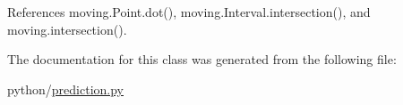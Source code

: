 References moving.\-Point.\-dot(), moving.\-Interval.\-intersection(), and moving.\-intersection().



The documentation for this class was generated from the following file\-:\begin{DoxyCompactItemize}
\item 
python/\hyperlink{prediction_8py}{prediction.\-py}\end{DoxyCompactItemize}
